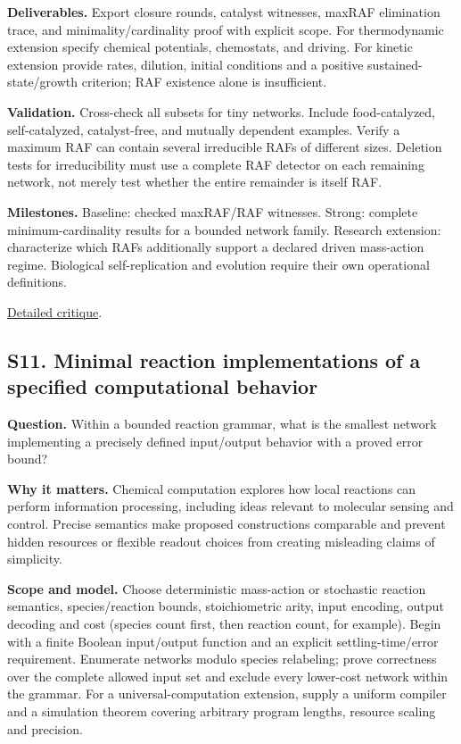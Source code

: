 \documentclass[
  11pt,
]{article}
\begin{document}
\textbf{Deliverables.} Export closure rounds, catalyst witnesses, maxRAF
elimination trace, and minimality/cardinality proof with explicit scope.
For thermodynamic extension specify chemical potentials, chemostats, and
driving. For kinetic extension provide rates, dilution, initial
conditions and a positive sustained-state/growth criterion; RAF
existence alone is insufficient.

\textbf{Validation.} Cross-check all subsets for tiny networks. Include
food-catalyzed, self-catalyzed, catalyst-free, and mutually dependent
examples. Verify a maximum RAF can contain several irreducible RAFs of
different sizes. Deletion tests for irreducibility must use a complete
RAF detector on each remaining network, not merely test whether the
entire remainder is itself RAF.

\textbf{Milestones.} Baseline: checked maxRAF/RAF witnesses. Strong:
complete minimum-cardinality results for a bounded network family.
Research extension: characterize which RAFs additionally support a
declared driven mass-action regime. Biological self-replication and
evolution require their own operational definitions.

\href{https://github.com/rick-stevens-ai/Pure-Thought/blob/main/reviews/29-Chemical-Reaction-Networks-Origins.md}{Detailed
critique}.

\subsection{S11. Minimal reaction implementations of a specified
computational behavior}

\textbf{Question.} Within a bounded reaction grammar, what is the
smallest network implementing a precisely defined input/output behavior
with a proved error bound?

\textbf{Why it matters.} Chemical computation explores how local
reactions can perform information processing, including ideas relevant
to molecular sensing and control. Precise semantics make proposed
constructions comparable and prevent hidden resources or flexible
readout choices from creating misleading claims of simplicity.

\textbf{Scope and model.} Choose deterministic mass-action or stochastic
reaction semantics, species/reaction bounds, stoichiometric arity, input
encoding, output decoding and cost (species count first, then reaction
count, for example). Begin with a finite Boolean input/output function
and an explicit settling-time/error requirement. Enumerate networks
modulo species relabeling; prove correctness over the complete allowed
input set and exclude every lower-cost network within the grammar. For a
universal-computation extension, supply a uniform compiler and a
simulation theorem covering arbitrary program lengths, resource scaling
and precision.
\end{document}
